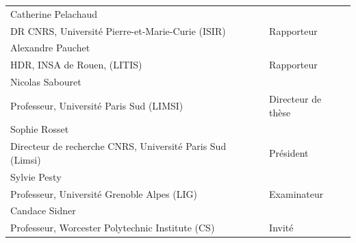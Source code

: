 \documentclass[a4paper]{article}
\newcommand{\jurynameA}{Catherine Pelachaud}
\newcommand{\juryadressA}{DR CNRS, Université Pierre-et-Marie-Curie (ISIR)}
\newcommand{\juryroleA}{Rapporteur}
\newcommand{\jurynameB}{Alexandre Pauchet}
\newcommand{\juryadressB}{HDR, INSA de Rouen, (LITIS)}
\newcommand{\juryroleB}{Rapporteur}
\newcommand{\jurynameD}{Sophie Rosset }
\newcommand{\juryadressD}{Directeur de recherche CNRS, Université Paris Sud (Limsi)}
\newcommand{\juryroleD}{Président}
\newcommand{\jurynameE}{Nicolas Sabouret}
\newcommand{\juryadressE}{Professeur, Université Paris Sud (LIMSI)}
\newcommand{\juryroleE}{Directeur de thèse}
\newcommand{\jurynameF}{Sylvie Pesty}
\newcommand{\juryadressF}{Professeur, Université Grenoble Alpes (LIG)}
\newcommand{\juryroleF}{Examinateur}
\newcommand{\jurynameG}{Charles Rich}
\newcommand{\juryadressG}{Professeur, Worcester Polytechnic Institute (CS)}
\newcommand{\juryroleG}{Encadrant de thèse}
\newcommand{\jurynameH}{Candace Sidner}
\newcommand{\juryadressH}{Professeur, Worcester Polytechnic Institute (CS)}
\newcommand{\juryroleH}{Invité}
\begin{document}
\begin{textblock}{10.3}
		\label{jury} 																				%
		\begin{flushleft}
			\begin{tabular}{@{} L{10cm} R{4cm}}
				\jurynameA  \\ \juryadressA & \juryroleA \\
				\jurynameB  \\ \juryadressB & \juryroleB \\
				\jurynameE  \\ \juryadressE & \juryroleE \\
				\jurynameD  \\ \juryadressD & \juryroleD \\
				\jurynameF  \\ \juryadressF & \juryroleF \\
				\jurynameH  \\ \juryadressH & \juryroleH \\
			\end{tabular} 
		\end{flushleft}   
	\end{textblock}
	
\end{document}
